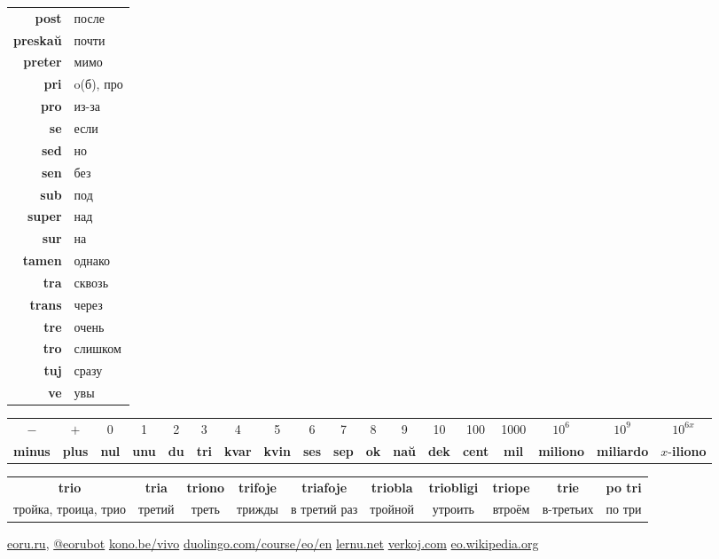\documentclass{article}
\def\b#1{\textbf{#1}}
\begin{document}
\begin{tabular}{>{\bfseries}rl}
post & после \\
preskaŭ & почти \\
preter & мимо \\
pri & o(б), про \\
pro & из-за \\
se & если \\
sed & но \\
sen & без \\
sub & под \\
super & над \\
sur & на \\
tamen & однако \\
tra & сквозь \\
trans & через \\
tre & очень \\
tro & слишком \\
tuj & сразу \\
ve & увы \\
\end{tabular}

\vspace{0.5em}
\begin{tabular}{|c|c|c|c|c|c|c|c|c|c|c|c|c|c|c|c|c|c|}
\hline
$-$ & $+$ & 0 & 1 & 2 & 3 & 4 & 5 & 6 & 7 & 8 & 9 & 10 & 100 & 1000 & $10^6$ & $10^9$ & $10^{6x}$ \\
\b{minus} & \b{plus} & \b{nul} & \b{unu} & \b{du} & \b{tri} & \b{kvar} & \b{kvin} & \b{ses} & \b{sep} & \b{ok} & \b{naŭ} & \b{dek} & \b{cent} & \b{mil} & \b{miliono} & \b{miliardo} & $x$-\b{iliono} \\
\hline
\end{tabular} 

\begin{tabular}{|c|c|c|c|c|c|c|c|c|c|}
\hline
\b{trio} & \b{tria} & \b{triono} & \b{trifoje} & \b{triafoje} & \b{triobla} & \,\b{triobligi}\, & \b{triope} & \b{trie} & \b{po tri} \\
тройка, троица, трио & третий & треть & трижды & в третий раз & тройной & утроить & втроём  & в-третьих & по три \\
\hline
\end{tabular}

\vspace{0.5em}
\href{http://eoru.ru/}{eoru.ru}, \href{https://t.me/eoru_bot}{@eoru\textunderscore{}bot}
\quad \href{https://kono.be/vivo}{kono.be/vivo}
\quad \href{https://duolingo.com/course/eo/en}{duolingo.com/course/eo/en}
\quad \href{https://lernu.net/}{lernu.net}
\quad \href{https://verkoj.com/}{verkoj.com}
\quad \href{https://eo.wikipedia.org/}{eo.wikipedia.org}
\end{document}
